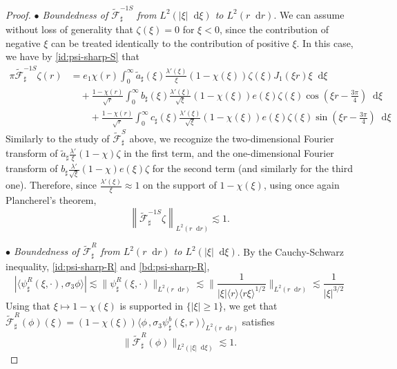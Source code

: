\documentclass[11 pt]{amsart}
\theoremstyle{definition}
\theoremstyle{remark}
\numberwithin{equation}{section}
\newcommand{\dd}{\mathop{}\!\mathrm{d}}
\begin{document}
\begin{proof}
\smallskip

\noindent \textit{$\bullet$ Boundedness of $\widetilde{\mathcal F}_\sharp^{-1S}$ from $L^2(|\xi|\dd \xi)$ to $L^2(r\dd r)$}. We can assume without loss of generality that $\zeta(\xi)=0$ for $\xi<0$, since the contribution of negative $\xi$ can be treated identically to the contribution of positive $\xi$. In this case, we have by \eqref{id:psi-sharp-S} that
\begin{align}
\label{formula-inverse-fourier-sharp-S} \pi \widetilde{\mathcal{F}}_\sharp^{-1S}\zeta (r) & = e_1 \chi(r) \int_0^\infty \widetilde{a}_\sharp(\xi) \frac{\lambda'(\xi)}{\xi} (1-\chi(\xi))\zeta(\xi) J_1(\xi r) \xi \dd \xi\\
\nonumber & \quad +\frac{1-\chi(r)}{\sqrt{r}}\int_0^\infty b_\sharp(\xi) \frac{\lambda'(\xi)}{\sqrt{\xi}} (1-\chi(\xi))e(\xi)\zeta(\xi) \cos\left( \xi r-\frac{3\pi}{4}\right) \dd \xi \\
\nonumber & \qquad +\frac{1-\chi(r)}{\sqrt{r}}\int_0^\infty c_\sharp(\xi) \frac{\lambda'(\xi)}{\sqrt{\xi}} (1-\chi(\xi))e(\xi)\zeta(\xi) \sin \left( \xi r-\frac{3\pi}{4} \right) \dd \xi 
\end{align}
Similarly to the study of $\widetilde{\mathcal F}_\sharp^S$ above, we recognize the two-dimensional Fourier transform of $ \widetilde{a}_\sharp \frac{\lambda'}{\xi} (1-\chi )\zeta $ in the first term, and the one-dimensional Fourier transform of $b_\sharp \frac{\lambda'}{\sqrt{\xi}} (1-\chi)e(\xi)\zeta $ for the second term (and similarly for the third one). Therefore, since $\frac{\lambda'(\xi)}{\xi}\approx 1 $ on the support of $1-\chi(\xi)$, using once again Plancherel's theorem,
$$
\left\| \widetilde{\mathcal{F}}_\sharp^{-1S} \zeta   \right\|_{L^2(r \dd r)} \lesssim 1.
$$

\smallskip

\noindent \textit{$\bullet$ Boundedness of $\widetilde{\mathcal F}_\sharp^R$ from $L^2(r\dd r)$ to $L^2(|\xi|\dd \xi)$}. By the Cauchy-Schwarz inequality, \eqref{id:psi-sharp-R} and \eqref{bd:psi-sharp-R},
$$
|\langle  \psi_\sharp^R(\xi,\cdot), \sigma_3 \phi\rangle|\lesssim \| \psi_\sharp^R(\xi,\cdot)\|_{L^2(r\dd r)} \lesssim \| \frac{1}{|\xi|\langle r \rangle \langle r \xi \rangle^{1/2}}\|_{L^2(r\dd r)}  \lesssim \frac{1}{|\xi|^{3/2}}
$$
Using that $\xi\mapsto 1-\chi(\xi)$ is supported in $\{|\xi|\geq 1\}$, we get that $ \widetilde{\mathcal{F}}_\sharp^R (\phi)(\xi) =  (1-\chi(\xi))\langle \phi \,, \sigma_3 \psi_\sharp^b (\xi,r) \rangle_{L^2(r\dd r)}$ satisfies
\begin{equation} \label{bd:Fourier-sharp-R-L2}
\| \widetilde{\mathcal F}_\sharp^R(\phi)\|_{L^2(| \xi | \dd \xi)} \lesssim 1 .
\end{equation}


\end{proof}
\end{document}
